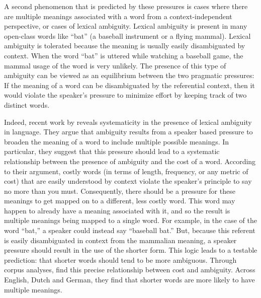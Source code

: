 \documentclass[man]{apa2}
\begin{document}
A second phenomenon that is predicted by these pressures is cases where there are multiple meanings associated with a word from a context-independent perspective, or cases of lexical ambiguity. Lexical ambiguity is present in  many open-class words like ``bat'' (a baseball instrument or a flying mammal). Lexical ambiguity is tolerated because the meaning is usually easily disambiguated by context. When the word ``bat'' is uttered while watching a baseball game, the mammal usage of the word is very unlikely. The presence of this type of ambiguity can be viewed as an equilibrium between the two pragmatic pressures: If the meaning of a word can be disambiguated by the referential context, then it would violate the speaker's pressure to minimize effort by keeping track of two distinct words.

Indeed, recent work by  reveals systematicity in the presence of lexical ambiguity in language. They argue that ambiguity results from a speaker based pressure to broaden the meaning of a word to include multiple possible meanings. In particular, they suggest that this pressure should lead to a systematic relationship between the presence of ambiguity and the cost of a word. According to their argument, costly words (in terms of length, frequency, or any metric of cost) that are easily understood by context violate the speaker's principle to say no more than you must. Consequently, there should be a pressure for these meanings to get mapped on to a different, less costly word. This word may happen to already have a meaning associated with it, and so the result is multiple meanings being mapped to a single word. For example, in the case of the word ``bat,'' a speaker could instead say ``baseball bat.'' But, because this referent is easily disambiguated in context from the mammalian meaning, a speaker pressure should result in the use of the shorter form. This logic leads to a testable prediction: that shorter words should tend to be more ambiguous. Through corpus analyses,  find this precise relationship between cost and ambiguity. Across English, Dutch and German, they find that shorter words are more likely to have multiple meanings.
\end{document}
